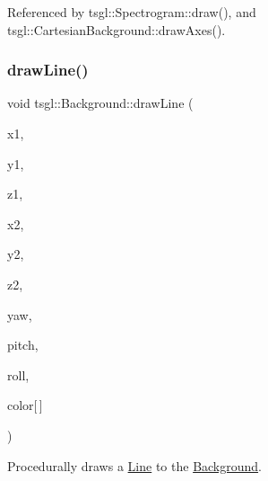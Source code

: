 Referenced by tsgl\+::\+Spectrogram\+::draw(), and tsgl\+::\+Cartesian\+Background\+::draw\+Axes().

\mbox{\label{classtsgl_1_1_background_a861124dc8a8446257ca7c0e521bf51eb}} 
\subsubsection{\texorpdfstring{draw\+Line()}{drawLine()}\hspace{0.1cm}{\footnotesize\ttfamily [2/4]}}
{\footnotesize\ttfamily void tsgl\+::\+Background\+::draw\+Line (\begin{DoxyParamCaption}\item[{float}]{x1,  }\item[{float}]{y1,  }\item[{float}]{z1,  }\item[{float}]{x2,  }\item[{float}]{y2,  }\item[{float}]{z2,  }\item[{float}]{yaw,  }\item[{float}]{pitch,  }\item[{float}]{roll,  }\item[{\hyperlink{structtsgl_1_1_color_float}{Color\+Float}}]{color\mbox{[}$\,$\mbox{]} }\end{DoxyParamCaption})\hspace{0.3cm}{\ttfamily [virtual]}}



Procedurally draws a \hyperlink{classtsgl_1_1_line}{Line} to the \hyperlink{classtsgl_1_1_background}{Background}. 

